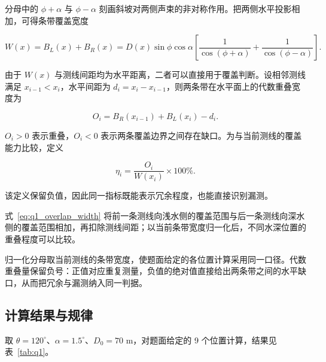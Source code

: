 分母中的 $\phi+\alpha$ 与 $\phi-\alpha$ 刻画斜坡对两侧声束的非对称作用。把两侧水平投影相加，可得条带覆盖宽度

\begin{equation}
  W(x)=B_L(x)+B_R(x)
      =D(x)\sin\phi\cos\alpha
      \left[\frac{1}{\cos(\phi+\alpha)}+\frac{1}{\cos(\phi-\alpha)}\right].
  \label{eq:q1_width}
\end{equation}

由于 $W(x)$ 与测线间距均为水平距离，二者可以直接用于覆盖判断。设相邻测线满足 $x_{i-1}<x_i$，水平间距为 $d_i=x_i-x_{i-1}$，则两条带在水平面上的代数重叠宽度为

\begin{equation}
  O_i=B_R(x_{i-1})+B_L(x_i)-d_i.
  \label{eq:q1_overlap_width}
\end{equation}

$O_i>0$ 表示重叠，$O_i<0$ 表示两条覆盖边界之间存在缺口。为与当前测线的覆盖能力比较，定义

\begin{equation}
  \eta_i=\frac{O_i}{W(x_i)}\times100\%.
  \label{eq:q1_overlap}
\end{equation}

该定义保留负值，因此同一指标既能表示冗余程度，也能直接识别漏测。

式~\eqref{eq:q1_overlap_width} 将前一条测线向浅水侧的覆盖范围与后一条测线向深水侧的覆盖范围相加，再扣除测线间距；以当前条带宽度归一化后，不同水深位置的重叠程度可以比较。

归一化分母取当前测线的条带宽度，使题面给定的各位置计算采用同一口径。代数重叠量保留负号：正值对应重复测量，负值的绝对值直接给出两条带之间的水平缺口，从而把冗余与漏测纳入同一判据。

\subsection{计算结果与规律}

取 $\theta=120^\circ$、$\alpha=1.5^\circ$、$D_0=70\text{ m}$，对题面给定的 9 个位置计算，结果见表~\ref{tab:q1}。

\begin{table}[H]
  \centering
  \caption{问题一各测线位置的水深、水平覆盖宽度与相邻重叠率}
  \label{tab:q1}
\end{table}

